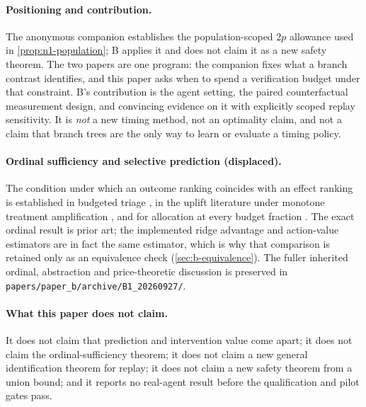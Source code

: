 \paragraph{Positioning and contribution.}
The anonymous companion \citep{companion2026} establishes the population-scoped
$2p$ allowance used in \cref{prop:n1-population}; B applies it and does not
claim it as a new safety theorem.  The two papers are one program: the companion
fixes what a branch contrast identifies, and this paper asks when to spend a
verification budget under that constraint.  B's contribution is the agent
setting, the paired counterfactual measurement design, and convincing evidence
on it with explicitly scoped replay sensitivity.  It is \emph{not} a new timing
method, not an optimality claim, and not a claim that branch trees are the only
way to learn or evaluate a timing policy.

\paragraph{Ordinal sufficiency and selective prediction (displaced).}
The condition under which an outcome ranking coincides with an effect ranking is
established in budgeted triage \citep{okati2021}, in the uplift literature under
monotone treatment amplification \citep{fernandezloria2022}, and for allocation
at every budget fraction \citep{kamran2024}.  The exact ordinal result is prior
art; the implemented ridge advantage and action-value estimators are in fact the
same estimator, which is why that comparison is retained only as an equivalence
check (\cref{sec:b-equivalence}).  The fuller inherited ordinal, abstraction and
price-theoretic discussion is preserved in
\texttt{papers/paper\_b/archive/B1\_20260927/}.

\paragraph{What this paper does not claim.}
It does not claim that prediction and intervention value come apart; it does not
claim the ordinal-sufficiency theorem; it does not claim a new general
identification theorem for replay; it does not claim a new safety theorem from a
union bound; and it reports no real-agent result before the qualification and
pilot gates pass.
